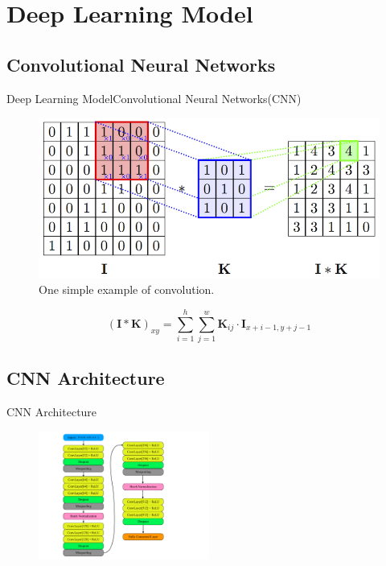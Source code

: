 \documentclass{beamer}
\begin{document}
\section{Deep Learning Model}
\subsection{Convolutional Neural Networks}
\begin{frame}{Deep Learning Model}{Convolutional Neural Networks(CNN)}
\begin{figure}[!h]
        \centering
        \includegraphics[scale=1.3]{../report/Figures/convolve.png}
        \caption{One simple example of convolution.}
        \label{con}
    \end{figure}
\pause
\begin{equation}
        (\pmb{I} * \pmb{K})_{xy} = \sum_{i=1}^{h}\sum_{j=1}^{w} \pmb{K}_{ij}\cdot \pmb{I}_{x+i-1, y+j-1}
\end{equation}
\end{frame}
\subsection{CNN Architecture}
\begin{frame}{CNN Architecture}
\begin{figure}[!h]
        \centering
        \includegraphics[width=0.5\textwidth]{../report/Figures/cnn_arc.pdf}
\end{figure}
\end{frame}
\end{document}
